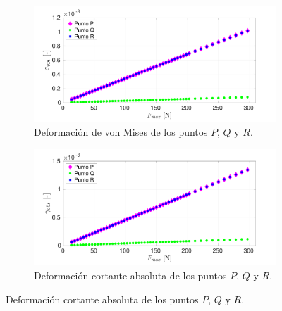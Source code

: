 \begin{figure}[H]
\centering
	\begin{subfigure}{1\linewidth}
		\centering
		\includegraphics[width=\linewidth, trim={1cm 0cm 2cm 0cm},clip]{Imagenes/def_vm.pdf}
		\caption{Deformación de von Mises de los puntos $P$, $Q$ y $R$.}
		\label{fig:def_normal201}
	\end{subfigure}
		\begin{subfigure}{1\linewidth}
		\centering
		\includegraphics[width=\linewidth, trim={1cm 0cm 2cm 0cm},clip]{Imagenes/def_ms.pdf}
		\caption{Deformación cortante absoluta de los puntos $P$, $Q$ y $R$.}
		\label{fig:def_vm201}
	\end{subfigure}
\end{figure}

